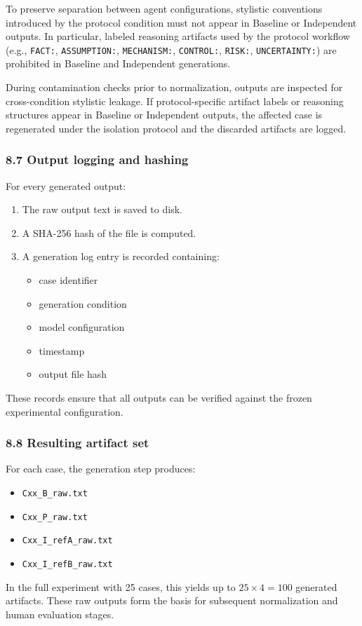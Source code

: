 {To preserve separation between agent configurations, stylistic conventions
introduced by the protocol condition must not appear in Baseline or
Independent outputs. In particular, labeled reasoning artifacts used by the
protocol workflow (e.g., \texttt{FACT:}, \texttt{ASSUMPTION:}, \texttt{MECHANISM:},
\texttt{CONTROL:}, \texttt{RISK:}, \texttt{UNCERTAINTY:}) are prohibited in
Baseline and Independent generations.

During contamination checks prior to normalization, outputs are inspected for
cross-condition stylistic leakage. If protocol-specific artifact labels or
reasoning structures appear in Baseline or Independent outputs, the affected
case is regenerated under the isolation protocol and the discarded artifacts
are logged.
\subsubsection*{8.7 Output logging and hashing}
For every generated output:
\begin{enumerate}
  \item The raw output text is saved to disk.
  \item A SHA-256 hash of the file is computed.
  \item A generation log entry is recorded containing:
        \begin{itemize}
          \item case identifier
          \item generation condition
          \item model configuration
          \item timestamp
          \item output file hash
        \end{itemize}
\end{enumerate}
These records ensure that all outputs can be verified against the frozen experimental configuration.

\subsubsection*{8.8 Resulting artifact set}
For each case, the generation step produces:
\begin{itemize}
  \item \texttt{Cxx\_B\_raw.txt}
  \item \texttt{Cxx\_P\_raw.txt}
  \item \texttt{Cxx\_I\_refA\_raw.txt}
  \item \texttt{Cxx\_I\_refB\_raw.txt}
\end{itemize}
In the full experiment with 25 cases, this yields up to $25 \times 4 = 100$ generated artifacts. These raw outputs form the basis
for subsequent normalization and human evaluation stages.

}
